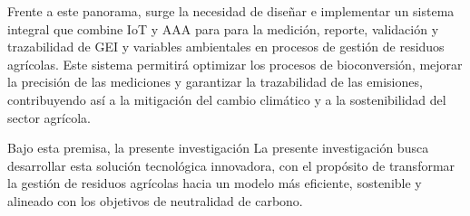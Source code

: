 Frente a este panorama, surge la necesidad de diseñar e implementar un sistema integral que combine IoT y AAA para para la medición, reporte, validación y trazabilidad de GEI y variables ambientales en procesos de gestión de residuos agrícolas. Este sistema permitirá optimizar los procesos de bioconversión, mejorar la precisión de las mediciones y garantizar la trazabilidad de las emisiones, contribuyendo así a la mitigación del cambio climático y a la sostenibilidad del sector agrícola.

Bajo esta premisa, la presente investigación La presente investigación busca desarrollar esta solución tecnológica innovadora, con el propósito de transformar la gestión de residuos agrícolas hacia un modelo más eficiente, sostenible y alineado con los objetivos de neutralidad de carbono.